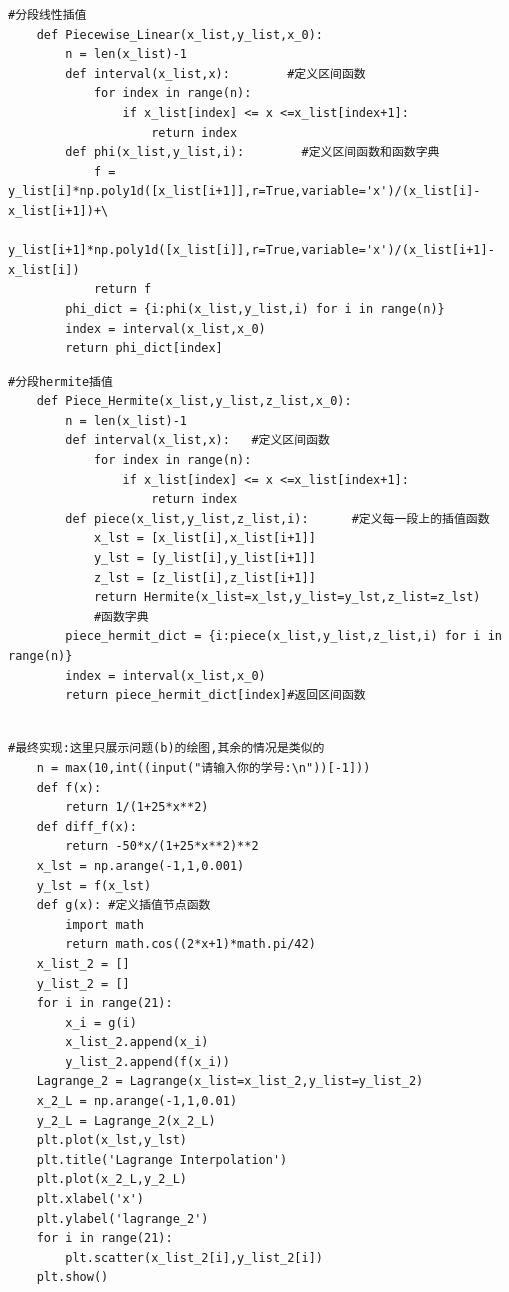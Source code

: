 \documentclass[12pt, a4paper, oneside]{ctexart}
\begin{document}
\begin{multicols}{2}
\begin{lstlisting}[style = python]
    #分段线性插值
    def Piecewise_Linear(x_list,y_list,x_0):
        n = len(x_list)-1
        def interval(x_list,x):        #定义区间函数
            for index in range(n):
                if x_list[index] <= x <=x_list[index+1]:
                    return index
        def phi(x_list,y_list,i):        #定义区间函数和函数字典
            f = y_list[i]*np.poly1d([x_list[i+1]],r=True,variable='x')/(x_list[i]-x_list[i+1])+\
            y_list[i+1]*np.poly1d([x_list[i]],r=True,variable='x')/(x_list[i+1]-x_list[i])
            return f
        phi_dict = {i:phi(x_list,y_list,i) for i in range(n)}
        index = interval(x_list,x_0)
        return phi_dict[index]
\end{lstlisting}


\begin{lstlisting}[style = python]
    #分段hermite插值
    def Piece_Hermite(x_list,y_list,z_list,x_0):
        n = len(x_list)-1
        def interval(x_list,x):   #定义区间函数
            for index in range(n):
                if x_list[index] <= x <=x_list[index+1]:
                    return index
        def piece(x_list,y_list,z_list,i):      #定义每一段上的插值函数
            x_lst = [x_list[i],x_list[i+1]]
            y_lst = [y_list[i],y_list[i+1]]
            z_lst = [z_list[i],z_list[i+1]]
            return Hermite(x_list=x_lst,y_list=y_lst,z_list=z_lst)
            #函数字典
        piece_hermit_dict = {i:piece(x_list,y_list,z_list,i) for i in range(n)}
        index = interval(x_list,x_0)
        return piece_hermit_dict[index]#返回区间函数
    
\end{lstlisting}

\begin{lstlisting}[style = python]
    #最终实现:这里只展示问题(b)的绘图,其余的情况是类似的
    n = max(10,int((input("请输入你的学号:\n"))[-1]))
    def f(x):
        return 1/(1+25*x**2) 
    def diff_f(x):
        return -50*x/(1+25*x**2)**2
    x_lst = np.arange(-1,1,0.001)
    y_lst = f(x_lst)
    def g(x): #定义插值节点函数
        import math
        return math.cos((2*x+1)*math.pi/42)
    x_list_2 = []
    y_list_2 = []
    for i in range(21):
        x_i = g(i)
        x_list_2.append(x_i)
        y_list_2.append(f(x_i))
    Lagrange_2 = Lagrange(x_list=x_list_2,y_list=y_list_2)
    x_2_L = np.arange(-1,1,0.01)
    y_2_L = Lagrange_2(x_2_L)
    plt.plot(x_lst,y_lst)
    plt.title('Lagrange Interpolation')
    plt.plot(x_2_L,y_2_L)
    plt.xlabel('x')
    plt.ylabel('lagrange_2')
    for i in range(21):
        plt.scatter(x_list_2[i],y_list_2[i])
    plt.show()
\end{lstlisting}
\end{multicols}  
\end{document}
